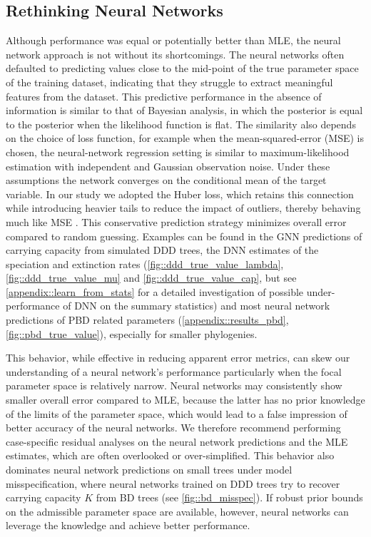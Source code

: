 {\subsection{Rethinking Neural Networks}
\label{ch2::sec::discussion::rethinking}
Although performance was equal or potentially better than MLE, the neural network approach is not without its shortcomings. The neural networks often defaulted to predicting values close to the mid-point of the true parameter space of the training dataset, indicating that they struggle to extract meaningful features from the dataset. This predictive performance in the absence of information is similar to that of Bayesian analysis, in which the posterior is equal to the posterior when the likelihood function is flat. The similarity also depends on the choice of loss function, for example when the mean-squared-error (MSE) is chosen, the neural-network regression setting is similar to maximum-likelihood estimation with independent and Gaussian observation noise. Under these assumptions the network converges on the conditional mean of the target variable. In our study we adopted the Huber loss, which retains this connection while introducing heavier tails to reduce the impact of outliers, thereby behaving much like MSE \citep{casella_statistical_2002, bishop_pattern_2006}. This conservative prediction strategy minimizes overall error compared to random guessing. Examples can be found in the GNN predictions of carrying capacity from simulated DDD trees, the DNN estimates of the speciation and extinction rates (\autoref{fig::ddd_true_value_lambda}, \autoref{fig::ddd_true_value_mu} and \autoref{fig::ddd_true_value_cap}, but see \autoref{appendix::learn_from_stats} for a detailed investigation of possible under-performance of DNN on the summary statistics) and most neural network predictions of PBD related parameters (\autoref{appendix::results_pbd}, \autoref{fig::pbd_true_value}), especially for smaller phylogenies. 

This behavior, while effective in reducing apparent error metrics, can skew our understanding of a neural network's performance particularly when the focal parameter space is relatively narrow. Neural networks may consistently show smaller overall error compared to MLE, because the latter has no prior knowledge of the limits of the parameter space, which would lead to a false impression of better accuracy of the neural networks. We therefore recommend performing case-specific residual analyses on the neural network predictions and the MLE estimates, which are often overlooked or over-simplified. This behavior also dominates neural network predictions on small trees under model misspecification, where neural networks trained on DDD trees try to recover carrying capacity $K$ from BD trees (see \autoref{fig::bd_misspec}). If robust prior bounds on the admissible parameter space are available, however, neural networks can leverage the knowledge and achieve better performance. 

}
